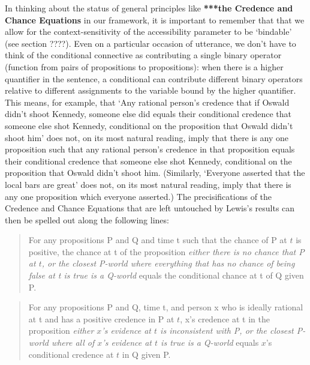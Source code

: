 \documentclass[leqno, 11pt, a5paper, openany]{article}
\begin{document}
In thinking about the status of general principles like \textbf{***the Credence and Chance Equations} in our framework, it is important to remember that that we allow for the context-sensitivity of the accessibility parameter to be ‘bindable’ (see section ????). Even on a particular occasion of utterance, we don't have to think of the conditional connective as contributing a single binary operator (function from pairs of propositions to propositions): when there is a higher quantifier in the sentence, a conditional can contribute different binary operators relative to different assignments to the variable bound by the higher quantifier. This means, for example, that `Any rational person's credence that if Oswald didn't shoot Kennedy, someone else did equals their conditional credence that someone else shot Kennedy, conditional on the proposition that Oswald didn't shoot him' does not, on its most natural reading, imply that there is any one proposition such that any rational person's credence in that proposition equals their conditional credence that someone else shot Kennedy, conditional on the proposition that Oswald didn't shoot him. (Similarly, ‘Everyone asserted that the local bars are great’ does not, on its most natural reading, imply that there is any one proposition which everyone asserted.) The precisifications of the Credence and Chance Equations that are left untouched by Lewis's results can then be spelled out along the following lines:
\begin{quote}
	For any propositions P and Q and time t such that the chance of P at $t$ is positive, the chance at t of the proposition \emph{either there is no chance that P at $t$, or the closest P-world where everything that has no chance of being false at t is true is a Q-world} equals the conditional chance at t of Q given P. 
\end{quote}
\begin{quote}
	For any propositions P and Q, time t, and person x who is ideally rational at t and has a positive credence in P at $t$, x's credence at t in the proposition \emph{either $x$'s evidence at $t$ is inconsistent with P, or the closest P-world where all of $x$'s evidence at $t$ is true is a Q-world} equals $x$'s conditional credence at $t$ in Q given P. 
\end{quote}
\end{document}
